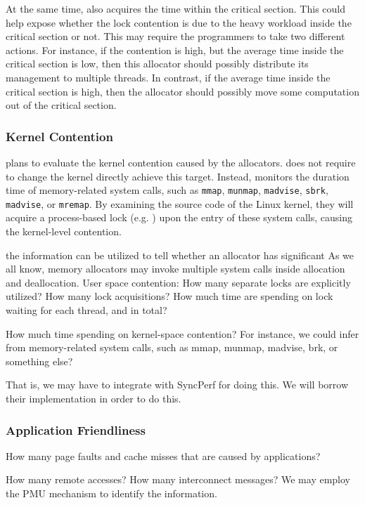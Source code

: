 At the same time, \MP{} also acquires the time within the critical section. This could help expose whether the lock contention is due to the heavy workload inside the critical section or not. This may require the programmers to take two different actions. For instance, if the contention is high, but the average time inside the critical section is low, then this allocator should possibly distribute its management to multiple threads. In contrast, if the average time inside the critical section is high, then the allocator should possibly move some computation out of the critical section. 

\subsubsection{Kernel Contention}
\MP{} plans to evaluate the kernel contention caused by the allocators. \MP{} does not require to change the kernel directly achieve this target. Instead, \MP{} monitors the duration time of memory-related system calls, such as \texttt{mmap}, \texttt{munmap}, \texttt{madvise}, \texttt{sbrk}, \texttt{madvise}, or \texttt{mremap}. By examining the source code of the Linux kernel, they will acquire a process-based lock (e.g. ) upon the entry of these system calls, causing the kernel-level contention.   

  
   the information can be utilized to tell whether an allocator has significant  
As we all know, memory allocators may invoke multiple system calls inside allocation and deallocation. 
User space contention:
How many separate locks are explicitly utilized? 
How many lock acquisitions? How much time are spending on lock waiting for each thread, and in total?

How much time spending on kernel-space contention? For instance, we could infer from memory-related system calls, such as mmap, munmap, madvise, brk, or something else? 

That is, we may have to integrate with SyncPerf for doing this. We will borrow their implementation in order to do this. 

\subsubsection{Application Friendliness} 
How many page faults and cache misses that are caused by applications? 

How many remote accesses? How many interconnect messages? We may employ the PMU mechanism to identify the information.

